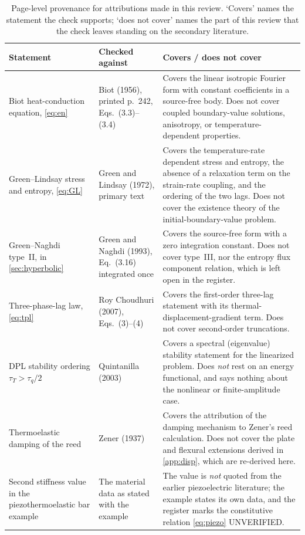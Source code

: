 \begin{table}[H]\centering\small
\caption{Page-level provenance for attributions made in this review. `Covers' names the statement the check
supports; `does not cover' names the part of this review that the check leaves standing on the secondary
literature.}
\label{tab:provenance}
\begin{tabularx}{\textwidth}{@{}p{3.1cm}Y Y@{}}
\toprule
\textbf{Statement} & \textbf{Checked against} & \textbf{Covers / does not cover} \\
\midrule
Biot heat-conduction equation, \eqref{eq:en} & Biot (1956), printed p.~242, Eqs.~(3.3)--(3.4) &
  Covers the linear isotropic Fourier form with constant coefficients in a source-free body. Does not
  cover coupled boundary-value solutions, anisotropy, or temperature-dependent properties. \\
Green--Lindsay stress and entropy, \eqref{eq:GL} & Green and Lindsay (1972), primary text &
  Covers the temperature-rate dependent stress and entropy, the absence of a relaxation term on the
  strain-rate coupling, and the ordering of the two lags. Does not cover the existence theory of the
  initial-boundary-value problem. \\
Green--Naghdi type~II, in \cref{sec:hyperbolic} & Green and Naghdi (1993), Eq.~(3.16) integrated once &
  Covers the source-free form with a zero integration constant. Does not cover type~III, nor the entropy
  flux component relation, which is left open in the register. \\
Three-phase-lag law, \eqref{eq:tpl} & Roy Choudhuri (2007), Eqs.~(3)--(4) &
  Covers the first-order three-lag statement with its thermal-displacement-gradient term. Does not cover
  second-order truncations. \\
DPL stability ordering $\tau_T>\tau_q/2$ & Quintanilla (2003) &
  Covers a spectral (eigenvalue) stability statement for the linearized problem. Does \emph{not} rest on
  an energy functional, and says nothing about the nonlinear or finite-amplitude case. \\
Thermoelastic damping of the reed & Zener (1937) &
  Covers the attribution of the damping mechanism to Zener's reed calculation. Does not cover the
  plate and flexural extensions derived in \cref{app:disp}, which are re-derived here. \\
Second stiffness value in the piezothermoelastic bar example & The material data as stated with the
  example & The value is \emph{not} quoted from the earlier piezoelectric literature; the example states
  its own data, and the register marks the constitutive relation \eqref{eq:piezo} UNVERIFIED. \\
\bottomrule
\end{tabularx}
\end{table}

